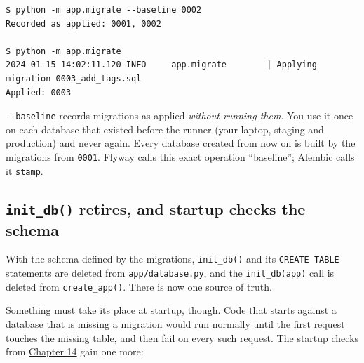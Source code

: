 \begin{outputbox}[short]
\begin{Verbatim}[fontsize=\codesize, breaklines, breakanywhere, breaksymbolleft={\tiny\textcolor{muted}{$\hookrightarrow$}}]
$ python -m app.migrate --baseline 0002
Recorded as applied: 0001, 0002

$ python -m app.migrate
2024-01-15 14:02:11.120 INFO     app.migrate        | Applying migration 0003_add_tags.sql
Applied: 0003
\end{Verbatim}
\end{outputbox}

\noindent{}\texttt{-\/-baseline} records migrations as applied \emph{without running them}. You use it once on each database that existed before the runner (your laptop, staging and production) and never again. Every database created from now on is built by the migrations from \texttt{0001}. Flyway calls this exact operation ``baseline''; Alembic calls it \texttt{stamp}.

\subsection*{\texorpdfstring{\texttt{init\_db()} retires, and startup checks the schema}{init\_db() retires, and startup checks the schema}}\label{33-logic-execution:init-db-retires-and-startup-checks-the-schema}

With the schema defined by the migrations, \texttt{init\_db()} and its \texttt{CREATE\ TABLE} statements are deleted from \texttt{app/database.py}, and the \texttt{init\_db(app)} call is deleted from \texttt{create\_app()}. There is now one source of truth.

Something must take its place at startup, though. Code that starts against a database that is missing a migration would run normally until the first request touches the missing table, and then fail on every such request. The startup checks from \hyperref[ch:14-runtime-contract]{Chapter 14} gain one more:

